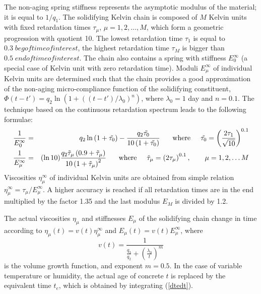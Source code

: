 \documentclass[a4paper]{article}
\begin{document}
The non-aging spring stiffness represents the asymptotic modulus of the material; it is equal to $1/q_1$.
The solidifying Kelvin chain is composed of $M$ Kelvin units with fixed retardation times $\tau_{\mu}$, $\mu = 1, 2, \dots, M$, which form a geometric progression with quotient 10. The lowest retardation time $\tau_1$ is equal to $0.3\; begoftimeofinterest$, the highest retardation time $\tau_M$ is bigger than $0.5\; endoftimeofinterest$. The chain also contains a spring with stiffness $E_0^\infty$
(a special case of Kelvin unit with zero retardation time).
Moduli $E_{\mu}^\infty$ of individual Kelvin units are determined such that the chain
provides a good approximation of the non-aging micro-compliance function of the solidifying constituent, $\Phi(t-t') = q_2 \ln \left( 1 + \left( \left(t-t' \right)/\lambda_0 \right)^n \right)$, where $\lambda_0 = 1$ day and $n = 0.1$. 
The technique based on the continuous retardation spectrum
leads to the following formulae:
\begin{eqnarray}
 \frac{1}{E_0^\infty} &=& q_2 \ln\left(1+\tilde{\tau_0}\right) - \frac{q_2 \tilde{\tau_0} }{10 \left( 1 + \tilde{\tau_0} \right)} \hspace{5 mm} \mbox{ where} \hspace{5 mm} \tilde{\tau_0} = \left( \frac{2 \tau_1}{ \sqrt{10}}  \right)^{0.1} \\
\frac{1}{E_\mu^\infty} &=&  (\ln 10) \frac{q_2 \tilde{\tau}_\mu \left(0.9 + \tilde{\tau}_\mu \right)}{10 \left( 1 + \tilde{\tau}_\mu \right)^2} \hspace{5 mm} \mbox{ where} \hspace{5 mm} \tilde{\tau}_\mu = \left(2 \tau_\mu \right)^{0.1}, \hspace{7 mm} \mu = 1,2,\dots M
\end{eqnarray}
Viscosities $\eta_{\mu}^\infty$ of individual Kelvin units are obtained from simple relation $\eta_{\mu}^\infty=\tau_{\mu}/E_{\mu}^\infty$. A higher accuracy is reached if all retardation times are in the end multiplied by the factor 1.35 and the last modulus $E_M$ is divided by 1.2.

The actual viscosities $\eta_{\mu}$ and stiffnesses $E_{\mu}$ of the solidifying chain change in time according to $\eta_{\mu}(t) = v(t) \eta_{\mu}^\infty$ and $E_{\mu}(t) = v(t) E_{\mu}^\infty$, where 
\begin{equation}
v(t)= \frac{1}{\frac{q_3}{q_2} + \left( \frac{\lambda_0}{ t} \right)^m}
\end{equation}
is the volume growth function, and exponent $m = 0.5$. In the case of variable temperature or humidity, the actual age of concrete 
$t$ is replaced by the equivalent time $t_e$, which is obtained by integrating
(\ref{dtedt}).
\end{document}
